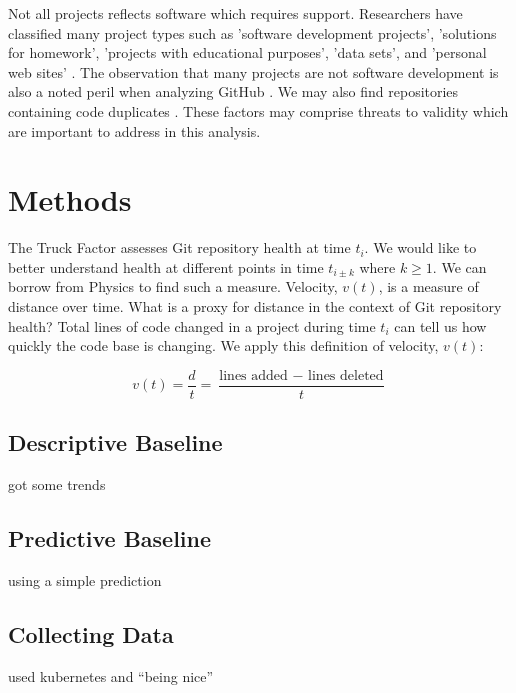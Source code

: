 \documentclass{article}
\begin{document}
Not all projects reflects software which requires support. Researchers have
classified many project types such as 'software development projects',
'solutions for homework', 'projects with educational purposes', 'data sets',
and 'personal web sites' \cite{soll2017classifyhub}. The observation that
many projects are not software development is also a noted peril when
analyzing GitHub \cite{kalliamvakou2016depth}. We may also find repositories
containing code duplicates \cite{lopes2017dejavu}. These factors may
comprise threats to validity which are important to address in this analysis.

\section{Methods}

The Truck Factor assesses Git repository health at time $t_i$. We would
like to better understand health at different points in time $t_{i \pm k}$
where $k \ge 1$. We can borrow from Physics to find such a measure. Velocity,
$v(t)$, is a measure of distance over time. What is a proxy for distance in
the context of Git repository health? Total lines of code changed in a
project during time $t_i$ can tell us how quickly the code base is
changing. We apply this definition of velocity, $v(t)$:

\begin{equation}
v(t) = \frac{d}{t} = \frac{\text{lines added } - \text{ lines deleted}}{t}
\end{equation}







\subsection{Descriptive Baseline}

got some trends

\subsection{Predictive Baseline}

using a simple prediction

\subsection{Collecting Data}

used kubernetes and ``being nice''
\end{document}
